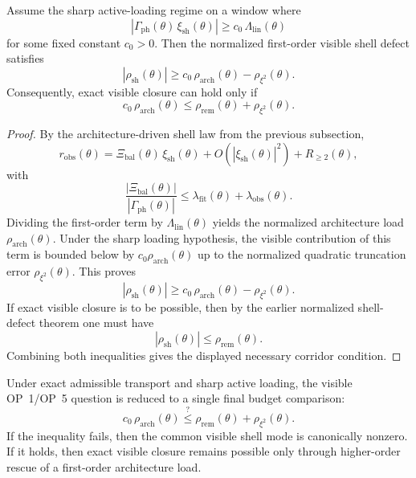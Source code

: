 \begin{theorem}
Assume the sharp active-loading regime on a window where
\[
  |\Gamma_{\mathrm{ph}}(\theta)\,\xi_{\mathrm{sh}}(\theta)|
  \ge c_0\,\Lambda_{\mathrm{lin}}(\theta)
\]
for some fixed constant \(c_0>0\). Then the normalized first-order visible shell defect satisfies
\[
  |\rho_{\mathrm{sh}}(\theta)|
  \ge c_0\,\rho_{\mathrm{arch}}(\theta)-\rho_{\xi^2}(\theta).
\]
Consequently, exact visible closure can hold only if
\[
  c_0\,\rho_{\mathrm{arch}}(\theta)
  \le
  \rho_{\mathrm{rem}}(\theta)+\rho_{\xi^2}(\theta).
\]
\end{theorem}

\begin{proof}
By the architecture-driven shell law from the previous subsection,
\[
  r_{\mathrm{obs}}(\theta)
  =
  \Xi_{\mathrm{bal}}(\theta)\,\xi_{\mathrm{sh}}(\theta)
  + O\!\left(|\xi_{\mathrm{sh}}(\theta)|^2\right)
  + R_{\ge 2}(\theta),
\]
with
\[
  \frac{|\Xi_{\mathrm{bal}}(\theta)|}{|\Gamma_{\mathrm{ph}}(\theta)|}
  \le
  \lambda_{\mathrm{fit}}(\theta)+\lambda_{\mathrm{obs}}(\theta).
\]
Dividing the first-order term by \(\Lambda_{\mathrm{lin}}(\theta)\) yields the normalized architecture load \(\rho_{\mathrm{arch}}(\theta)\). Under the sharp loading hypothesis, the visible contribution of this term is bounded below by \(c_0\rho_{\mathrm{arch}}(\theta)\) up to the normalized quadratic truncation error \(\rho_{\xi^2}(\theta)\). This proves
\[
  |\rho_{\mathrm{sh}}(\theta)|
  \ge c_0\,\rho_{\mathrm{arch}}(\theta)-\rho_{\xi^2}(\theta).
\]
If exact visible closure is to be possible, then by the earlier normalized shell-defect theorem one must have
\[
  |\rho_{\mathrm{sh}}(\theta)|\le \rho_{\mathrm{rem}}(\theta).
\]
Combining both inequalities gives the displayed necessary corridor condition.
\end{proof}

\begin{corollary}
Under exact admissible transport and sharp active loading, the visible OP~1/OP~5 question is reduced to a single final budget comparison:
\[
  c_0\,\rho_{\mathrm{arch}}(\theta)
  \stackrel{?}{\le}
  \rho_{\mathrm{rem}}(\theta)+\rho_{\xi^2}(\theta).
\]
If the inequality fails, then the common visible shell mode is canonically nonzero. If it holds, then exact visible closure remains possible only through higher-order rescue of a first-order architecture load.
\end{corollary}

